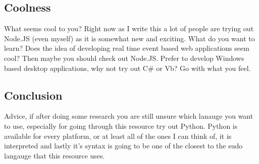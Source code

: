 \subsection{Coolness}
What seems cool to you? Right now as I write this a lot of people are trying out Node.JS (even myself) as it is somewhat new and exciting.
What do you want to learn? Does the idea of developing real time event based web applications seem cool? Then maybe you should check out
Node.JS. Prefer to develop Windows based desktop applications, why not try out C\# or Vb? Go with what you feel.

\subsection{Conclusion}
Advice, if after doing some research you are still unsure which lanauge you want to use, especially for going through this resource try out
Python. Python is available for every platform, or at least all of the ones I can think of, it is interpreted and lastly it's syntax is
going to be one of the closest to the sudo langauge that this resource uses.
